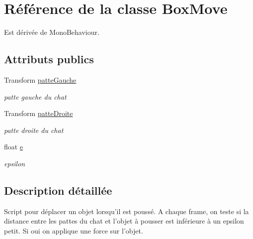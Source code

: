\hypertarget{class_box_move}{\section{Référence de la classe Box\+Move}
\label{class_box_move}
}


Est dérivée de Mono\+Behaviour.

\subsection*{Attributs publics}
\begin{DoxyCompactItemize}
\item 
\hypertarget{class_box_move_a3dc0367a44ea3b079dac50bc373f591b}{Transform \hyperlink{class_box_move_a3dc0367a44ea3b079dac50bc373f591b}{patte\+Gauche}}\label{class_box_move_a3dc0367a44ea3b079dac50bc373f591b}

\begin{DoxyCompactList}\small\item\em patte gauche du chat \end{DoxyCompactList}\item 
\hypertarget{class_box_move_adbb2cbdf4a54dfdf7a91600ad6685f2b}{Transform \hyperlink{class_box_move_adbb2cbdf4a54dfdf7a91600ad6685f2b}{patte\+Droite}}\label{class_box_move_adbb2cbdf4a54dfdf7a91600ad6685f2b}

\begin{DoxyCompactList}\small\item\em patte droite du chat \end{DoxyCompactList}\item 
\hypertarget{class_box_move_a50cf7520571b793c4fc056a51457f004}{float \hyperlink{class_box_move_a50cf7520571b793c4fc056a51457f004}{e}}\label{class_box_move_a50cf7520571b793c4fc056a51457f004}

\begin{DoxyCompactList}\small\item\em epsilon \end{DoxyCompactList}\end{DoxyCompactItemize}


\subsection{Description détaillée}
Script pour déplacer un objet lorsqu'il est poussé. A chaque frame, on teste si la distance entre les pattes du chat et l'objet à pousser est inférieure à un epsilon petit. Si oui on applique une force sur l'objet. 